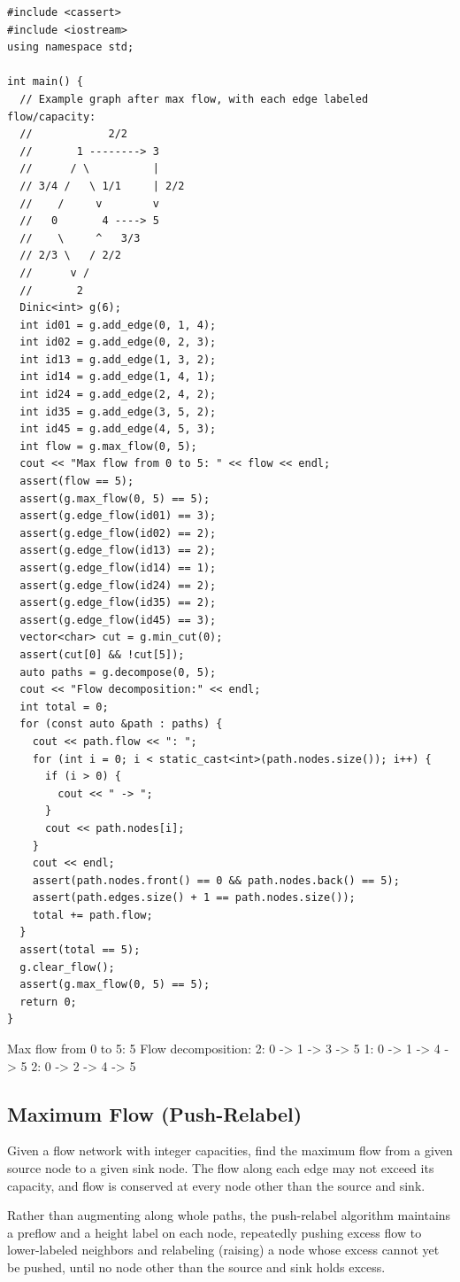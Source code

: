 \begin{lstlisting}[style=cpp]
#include <cassert>
#include <iostream>
using namespace std;

int main() {
  // Example graph after max flow, with each edge labeled flow/capacity:
  //            2/2
  //       1 --------> 3
  //      / \          |
  // 3/4 /   \ 1/1     | 2/2
  //    /     v        v
  //   0       4 ----> 5
  //    \     ^   3/3
  // 2/3 \   / 2/2
  //      v /
  //       2
  Dinic<int> g(6);
  int id01 = g.add_edge(0, 1, 4);
  int id02 = g.add_edge(0, 2, 3);
  int id13 = g.add_edge(1, 3, 2);
  int id14 = g.add_edge(1, 4, 1);
  int id24 = g.add_edge(2, 4, 2);
  int id35 = g.add_edge(3, 5, 2);
  int id45 = g.add_edge(4, 5, 3);
  int flow = g.max_flow(0, 5);
  cout << "Max flow from 0 to 5: " << flow << endl;
  assert(flow == 5);
  assert(g.max_flow(0, 5) == 5);
  assert(g.edge_flow(id01) == 3);
  assert(g.edge_flow(id02) == 2);
  assert(g.edge_flow(id13) == 2);
  assert(g.edge_flow(id14) == 1);
  assert(g.edge_flow(id24) == 2);
  assert(g.edge_flow(id35) == 2);
  assert(g.edge_flow(id45) == 3);
  vector<char> cut = g.min_cut(0);
  assert(cut[0] && !cut[5]);
  auto paths = g.decompose(0, 5);
  cout << "Flow decomposition:" << endl;
  int total = 0;
  for (const auto &path : paths) {
    cout << path.flow << ": ";
    for (int i = 0; i < static_cast<int>(path.nodes.size()); i++) {
      if (i > 0) {
        cout << " -> ";
      }
      cout << path.nodes[i];
    }
    cout << endl;
    assert(path.nodes.front() == 0 && path.nodes.back() == 5);
    assert(path.edges.size() + 1 == path.nodes.size());
    total += path.flow;
  }
  assert(total == 5);
  g.clear_flow();
  assert(g.max_flow(0, 5) == 5);
  return 0;
}
\end{lstlisting}
\begin{exampleoutput}
Max flow from 0 to 5: 5
Flow decomposition:
2: 0 -> 1 -> 3 -> 5
1: 0 -> 1 -> 4 -> 5
2: 0 -> 2 -> 4 -> 5
\end{exampleoutput}
\subsection{Maximum Flow (Push-Relabel)}
\label{sec:4.5.4}
Given a flow network with integer capacities, find the maximum flow from a given source node to a given sink node. The flow along each edge may not exceed its capacity, and flow is conserved at every node other than the source and sink.

Rather than augmenting along whole paths, the push-relabel algorithm maintains a preflow and a height label on each node, repeatedly pushing excess flow to lower-labeled neighbors and relabeling (raising) a node whose excess cannot yet be pushed, until no node other than the source and sink holds excess.

